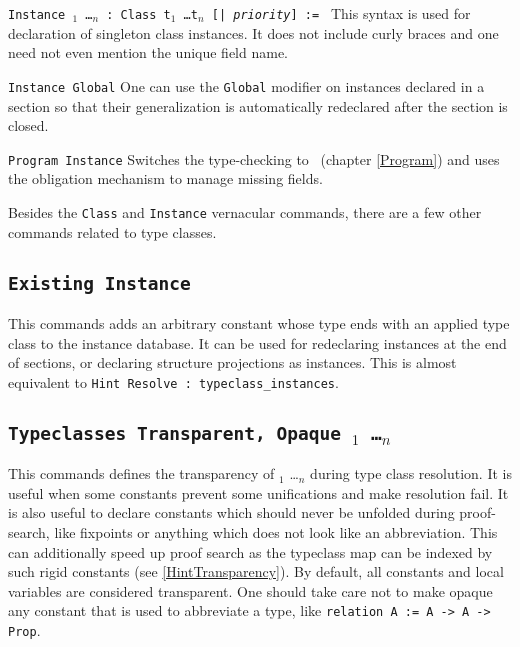\begin{Variants}
\item {\tt Instance {\ident} {\binder$_1$ \ldots \binder$_n$} :
    {Class} {t$_1$ \ldots t$_n$} [| \textit{priority}] := \term} 
  This syntax is used for declaration of singleton class instances. 
  It does not include curly braces and one need not even mention
  the unique field name.

\item {\tt Instance Global} One can use the \texttt{Global} modifier on
  instances declared in a section so that their generalization is automatically
  redeclared after the section is closed.

\item {\tt Program Instance} 
  Switches the type-checking to \Program~(chapter \ref{Program})
  and uses the obligation mechanism to manage missing fields.
\end{Variants}

Besides the {\tt Class} and {\tt Instance} vernacular commands, there
are a few other commands related to type classes.

\subsection{\tt Existing Instance {\ident}}
\label{ExistingInstance}

This commands adds an arbitrary constant whose type ends with an applied
type class to the instance database. It can be used for redeclaring
instances at the end of sections, or declaring structure projections as
instances. This is almost equivalent to {\tt Hint Resolve {\ident} :
  typeclass\_instances}.

\subsection{\tt Typeclasses Transparent, Opaque {\ident$_1$ \ldots \ident$_n$}}
\label{TypeclassesTransparency}

This commands defines the transparency of {\ident$_1$ \ldots \ident$_n$} 
during type class resolution. It is useful when some constants prevent some
unifications and make resolution fail. It is also useful to declare
constants which should never be unfolded during proof-search, like
fixpoints or anything which does not look like an abbreviation. This can
additionally speed up proof search as the typeclass map can be indexed
by such rigid constants (see \ref{HintTransparency}).
By default, all constants and local variables are considered transparent.
One should take care not to make opaque any constant that is used to
abbreviate a type, like {\tt relation A := A -> A -> Prop}.

